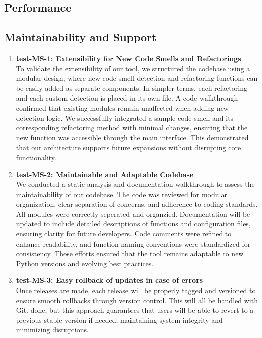 \documentclass[12pt, titlepage]{article}
\begin{document}
\subsection{Performance}

\subsection{Maintainability and Support}
\begin{enumerate}

\item \textbf{test-MS-1: Extensibility for New Code Smells and Refactorings} \\[2mm]
To validate the extensibility of our tool, we structured the codebase using a modular design, where new code smell detection and refactoring functions can 
be easily added as separate components. In simpler terms, each refactoring and each custom detection is placed in its own file. A code walkthrough confirmed that 
existing modules remain unaffected when adding new detection logic. We successfully integrated a sample code smell and its corresponding refactoring method with 
minimal changes, ensuring that the new function was accessible through the main interface. This demonstrated that our architecture supports future expansions without 
disrupting core functionality.

\item \textbf{test-MS-2: Maintainable and Adaptable Codebase} \\[2mm]
We conducted a static analysis and documentation walkthrough to assess the maintainability of our codebase. The code was reviewed for modular organization, clear separation 
of concerns, and adherence to coding standards. All modules were correctly seperated and organzied. Documentation will be updated to include detailed descriptions of functions 
and configuration files, ensuring clarity for future developers. Code comments were refined to enhance readability, and function naming conventions were standardized for 
consistency. These efforts ensured that the tool remains adaptable to new Python versions and evolving best practices.

\item \textbf{test-MS-3: Easy rollback of updates in case of errors} \\[2mm]
Once releases are made, each release will be properly tagged and versioned to ensure smooth rollbacks through version control. This will all be handled with Git. done, but 
this approach guarantees that users will be able to revert to a previous stable version if needed, maintaining system integrity and minimizing disruptions.
\end{enumerate}
\end{document}
